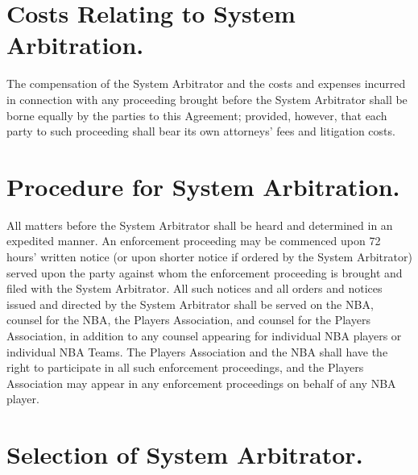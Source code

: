 \documentclass[
]{book}
\begin{document}
\hypertarget{costs-relating-to-system-arbitration.}{%
\section{Costs Relating to System Arbitration.}\label{costs-relating-to-system-arbitration.}}

The compensation of the System Arbitrator and the costs and expenses incurred in connection with any proceeding brought before the System Arbitrator shall be borne equally by the parties to this Agreement; provided, however, that each party to such proceeding shall bear its own attorneys' fees and litigation costs.

\hypertarget{procedure-for-system-arbitration.}{%
\section{Procedure for System Arbitration.}\label{procedure-for-system-arbitration.}}

All matters before the System Arbitrator shall be heard and determined in an expedited manner. An enforcement proceeding may be commenced upon 72 hours' written notice (or upon shorter notice if ordered by the System Arbitrator) served upon the party against whom the enforcement proceeding is brought and filed with the System Arbitrator. All such notices and all orders and notices issued and directed by the System Arbitrator shall be served on the NBA, counsel for the NBA, the Players Association, and counsel for the Players Association, in addition to any counsel appearing for individual NBA players or individual NBA Teams. The Players Association and the NBA shall have the right to participate in all such enforcement proceedings, and the Players Association may appear in any enforcement proceedings on behalf of any NBA player.

\hypertarget{selection-of-system-arbitrator.}{%
\section{Selection of System Arbitrator.}\label{selection-of-system-arbitrator.}}
\end{document}
